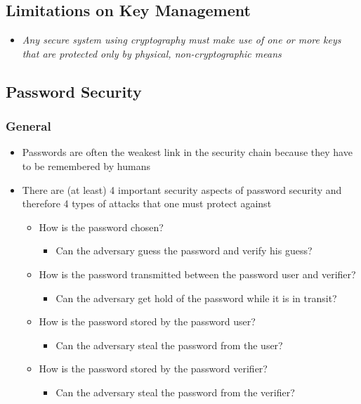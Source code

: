 \documentclass[11pt]{article}
\begin{document}
\subsection{Limitations on Key Management}
\label{sec:orge9f5269}
\begin{itemize}
\item \emph{Any secure system using cryptography must make use of one or more keys that are protected only by physical, non-cryptographic means}
\end{itemize}

\subsection{Password Security}
\label{sec:org82f38fe}
\subsubsection{General}
\label{sec:org0343340}
\begin{itemize}
\item Passwords are often the weakest link in the security chain because they have to be remembered by humans

\item There are (at least) 4 important security aspects of password security and therefore 4 types of attacks that one must protect against
\begin{itemize}
\item How is the password chosen?
\begin{itemize}
\item Can the adversary guess the password and verify his guess?
\end{itemize}
\item How is the password transmitted between the password user and verifier?
\begin{itemize}
\item Can the adversary get hold of the password while it is in transit?
\end{itemize}
\item How is the password stored by the password user?
\begin{itemize}
\item Can the adversary steal the password from the user?
\end{itemize}
\item How is the password stored by the password verifier?
\begin{itemize}
\item Can the adversary steal the password from the verifier?
\end{itemize}
\end{itemize}
\end{itemize}
\end{document}

